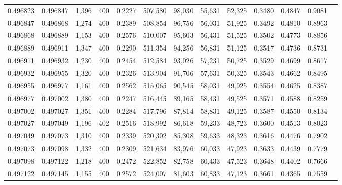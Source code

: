 \begin{tabular}{rrrrrrrrrrrrr}
0.496823 & 0.496847 &  1,396 & 400 &                                     0.2227 & 507,580 &  98,030 &  55,631 &  52,325 & 0.3480 & 0.4847 & 0.9081 \\
0.496847 & 0.496868 &  1,274 & 400 &                                     0.2389 & 508,854 &  96,756 &  56,031 &  51,925 & 0.3492 & 0.4810 & 0.8963 \\
0.496868 & 0.496889 &  1,153 & 400 &                                     0.2576 & 510,007 &  95,603 &  56,431 &  51,525 & 0.3502 & 0.4773 & 0.8856 \\
0.496889 & 0.496911 &  1,347 & 400 &                                     0.2290 & 511,354 &  94,256 &  56,831 &  51,125 & 0.3517 & 0.4736 & 0.8731 \\
0.496911 & 0.496932 &  1,230 & 400 &                                     0.2454 & 512,584 &  93,026 &  57,231 &  50,725 & 0.3529 & 0.4699 & 0.8617 \\
0.496932 & 0.496955 &  1,320 & 400 &                                     0.2326 & 513,904 &  91,706 &  57,631 &  50,325 & 0.3543 & 0.4662 & 0.8495 \\
0.496955 & 0.496977 &  1,161 & 400 &                                     0.2562 & 515,065 &  90,545 &  58,031 &  49,925 & 0.3554 & 0.4625 & 0.8387 \\
0.496977 & 0.497002 &  1,380 & 400 &                                     0.2247 & 516,445 &  89,165 &  58,431 &  49,525 & 0.3571 & 0.4588 & 0.8259 \\
0.497002 & 0.497027 &  1,351 & 400 &                                     0.2284 & 517,796 &  87,814 &  58,831 &  49,125 & 0.3587 & 0.4550 & 0.8134 \\
0.497027 & 0.497049 &  1,196 & 402 &                                     0.2516 & 518,992 &  86,618 &  59,233 &  48,723 & 0.3600 & 0.4513 & 0.8023 \\
0.497049 & 0.497073 &  1,310 & 400 &                                     0.2339 & 520,302 &  85,308 &  59,633 &  48,323 & 0.3616 & 0.4476 & 0.7902 \\
0.497073 & 0.497098 &  1,332 & 400 &                                     0.2309 & 521,634 &  83,976 &  60,033 &  47,923 & 0.3633 & 0.4439 & 0.7779 \\
0.497098 & 0.497122 &  1,218 & 400 &                                     0.2472 & 522,852 &  82,758 &  60,433 &  47,523 & 0.3648 & 0.4402 & 0.7666 \\
0.497122 & 0.497145 &  1,155 & 400 &                                     0.2572 & 524,007 &  81,603 &  60,833 &  47,123 & 0.3661 & 0.4365 & 0.7559 \\

\end{tabular}
